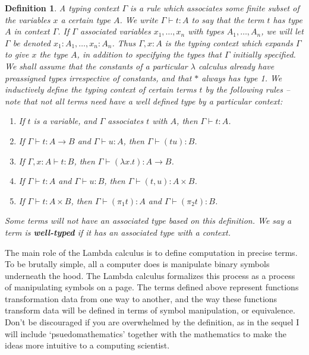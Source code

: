 \documentclass{article}
\theoremstyle{plain}
\newtheorem{definition}{Definition}
\begin{document}
\begin{definition}
    A typing context $\Gamma$ is a rule which associates some finite subset of the variables $x$ a certain type $A$. We write $\Gamma \vdash t : A$ to say that the term $t$ has type $A$ in context $\Gamma$. If $\Gamma$ associated variables $x_1, \dots, x_n$ with types $A_1, \dots, A_n$, we will let $\Gamma$ be denoted $x_1:A_1, \dots, x_n:A_n$. Thus $\Gamma, x:A$ is the typing context which expands $\Gamma$ to give $x$ the type $A$, in addition to specifying the types that $\Gamma$ initially specified. We shall assume that the constants of a particular $\lambda$ calculus already have preassigned types irrespective of constants, and that $*$ always has type 1. We inductively define the typing context of certain terms $t$ by the following rules -- note that not all terms need have a well defined type by a particular context:
    \begin{enumerate}
        \item If $t$ is a variable, and $\Gamma$ associates $t$ with $A$, then $\Gamma \vdash t : A$.
        \item If $\Gamma \vdash t : A \rightarrow B$ and $\Gamma \vdash u : A$, then $\Gamma \vdash (tu) : B$.
        \item If $\Gamma, x : A \vdash t : B$, then $\Gamma \vdash (\lambda x.t) : A \to B$.
        \item If $\Gamma \vdash t: A$ and $\Gamma \vdash u : B$, then $\Gamma \vdash (t,u): A \times B$.
        \item If $\Gamma \vdash t: A \times B$, then $\Gamma \vdash (\pi_1 t) : A$ and $\Gamma \vdash (\pi_2 t) : B$.
    \end{enumerate}
    Some terms will not have an associated type based on this definition. We say a term is {\bf well-typed} if it has an associated type with a context.
\end{definition}

The main role of the Lambda calculus is to define computation in precise terms. To be brutally simple, all a computer does is manipulate binary symbols underneath the hood. The Lambda calculus formalizes this process as a process of manipulating symbols on a page. The terms defined above represent functions transformation data from one way to another, and the way these functions transform data will be defined in terms of symbol manipulation, or equivalence. Don't be discouraged if you are overwhelmed by the definition, as in the sequel I will include `psuedomathematics' together with the mathematics to make the ideas more intuitive to a computing scientist.
\end{document}
